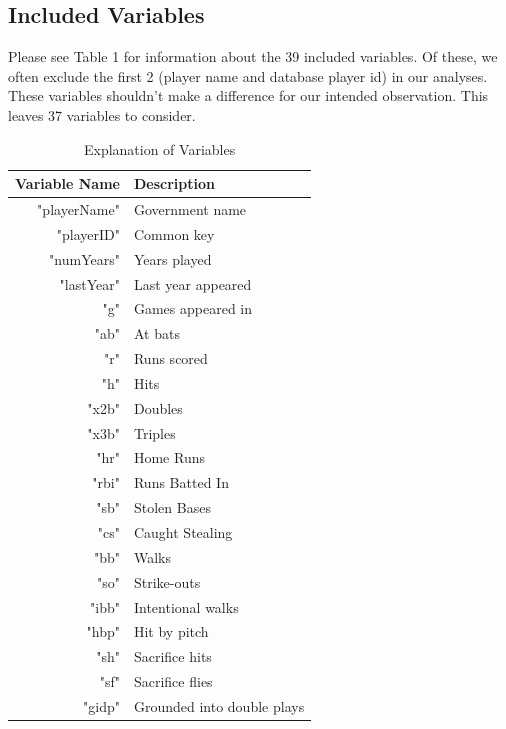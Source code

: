 \documentclass[letterpaper, 10 pt, conference]{ieeeconf}
\begin{document}
\subsection{Included Variables}
Please see Table 1 for information about the 39 included variables. Of these, we often exclude the first 2 (player name and database player id) in our analyses. These variables shouldn't make a difference for our intended observation. This leaves 37 variables to consider.
\begin{table}[h]
\caption{Explanation of Variables}
\centering
\begin{tabular}{@{}rl@{}}
\toprule
Variable Name & Description                   \\ \midrule
"playerName"  & Government name               \\
"playerID"    & Common key                    \\
"numYears"    & Years played                  \\
"lastYear"    & Last year appeared            \\
"g"           & Games appeared in             \\
"ab"          & At bats                       \\
"r"           & Runs scored                   \\
"h"           & Hits                          \\
"x2b"         & Doubles                       \\
"x3b"         & Triples                       \\
"hr"          & Home Runs                     \\
"rbi"         & Runs Batted In                \\
"sb"          & Stolen Bases                  \\
"cs"          & Caught Stealing               \\
"bb"          & Walks                         \\
"so"          & Strike-outs                   \\
"ibb"         & Intentional walks             \\
"hbp"         & Hit by pitch                  \\
"sh"          & Sacrifice hits                \\
"sf"          & Sacrifice flies               \\
"gidp"        & Grounded into double plays    \\

\end{tabular}
\end{table}
\end{document}
